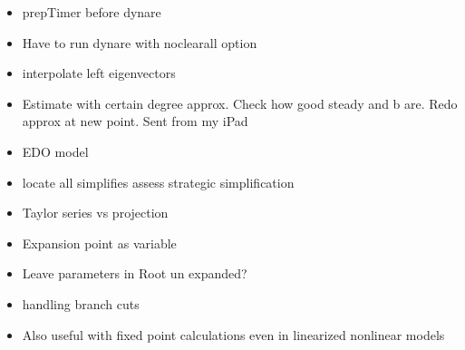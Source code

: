 \documentclass[12pt]{article}
\begin{document}
\begin{itemize}
\item prepTimer before dynare
\item Have to run dynare with noclearall option
\item interpolate left eigenvectors
\item 
Estimate with certain degree approx.
Check how good steady and b are. Redo approx at new point.
Sent from my iPad

\item EDO model

\item locate all simplifies assess strategic simplification
\item Taylor series vs projection
\item Expansion point as variable
\item Leave parameters in Root un expanded?
\item handling branch cuts
\item Also useful with fixed point calculations even in linearized nonlinear models


\end{itemize}
\end{document}
